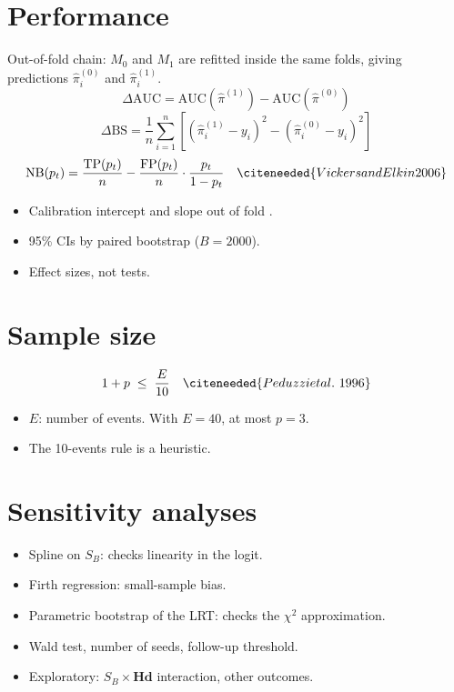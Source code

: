 \section{Performance}
Out-of-fold chain: $M_0$ and $M_1$ are refitted inside the same folds, giving predictions $\hat{\pi}^{(0)}_i$ and $\hat{\pi}^{(1)}_i$.
\begin{equation}
    \Delta\mathrm{AUC} = \mathrm{AUC}\left(\hat{\pi}^{(1)}\right) - \mathrm{AUC}\left(\hat{\pi}^{(0)}\right)
\end{equation}
\begin{equation}
    \Delta\mathrm{BS} = \frac{1}{n}\sum_{i=1}^{n}\left[\left(\hat{\pi}_i^{(1)} - y_i\right)^2 - \left(\hat{\pi}_i^{(0)} - y_i\right)^2\right]
\end{equation}
\begin{equation}
    \mathrm{NB}(p_t) = \frac{\mathrm{TP}(p_t)}{n} - \frac{\mathrm{FP}(p_t)}{n}\cdot\frac{p_t}{1 - p_t}
    \quad \citeneeded{Vickers and Elkin 2006}
\end{equation}
\begin{itemize}
    \item Calibration intercept and slope out of fold \cite{alba_discrimination_2017}.
    \item 95\% CIs by paired bootstrap ($B = 2000$).
    \item Effect sizes, not tests.
\end{itemize}

\section{Sample size}
\begin{equation}
    1 + p \;\le\; \frac{E}{10}
    \quad \citeneeded{Peduzzi et al.\ 1996}
\end{equation}
\begin{itemize}
    \item $E$: number of events. With $E = 40$, at most $p = 3$.
    \item The 10-events rule is a heuristic. 
\end{itemize}

\section{Sensitivity analyses}
\begin{itemize}
    \item Spline on $S_B$: checks linearity in the logit.
    \item Firth regression: small-sample bias. 
    \item Parametric bootstrap of the LRT: checks the $\chi^2$ approximation. 
    \item Wald test, number of seeds, follow-up threshold.
    \item Exploratory: $S_B \times \mathbf{Hd}$ interaction, other outcomes.
\end{itemize}

